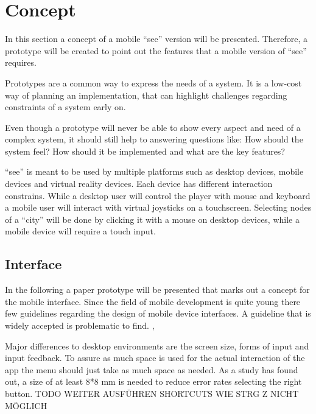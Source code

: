 \section{Concept}
\label{section:concept}
In this section a concept of a mobile \enquote{\gls{see}} version will be presented. 
Therefore, a prototype will be created to point out the features that a mobile version of \enquote{\gls{see}} requires.

Prototypes are a common way to express the needs of a system. 
It is a low-cost way of planning an implementation, that can highlight challenges regarding constraints of a system early on.

Even though a prototype will never be able to show every aspect and need of a complex system, it should still help to answering questions like: 
How should the system feel? How should it be implemented and what are the key features? \cite{houde1997prototypes} 

\enquote{\gls{see}} is meant to be used by multiple platforms such as desktop devices, mobile devices and virtual reality devices.
Each device has different interaction constrains. 
While a desktop user will control the player with mouse and keyboard a mobile user will interact with virtual joysticks on a touchscreen.
Selecting nodes of a \enquote{\gls{city}} will be done by clicking it with a mouse on desktop devices, while a mobile device will require a touch input.

\subsection{Interface}

In the following a paper prototype will be presented that marks out a concept for the mobile interface.
Since the field of mobile development is quite young there few guidelines regarding the design of mobile device interfaces.
A guideline that is widely accepted is problematic to find. \cite{renaud2017demarcating}, \cite{punchoojit2017usability}

Major differences to desktop environments are the screen size, forms of input and input feedback.
To assure as much space is used for the actual interaction of the app the menu should just take as much space as needed.
As a study has found out, a size of at least 8*8 mm is needed to reduce error rates selecting the right button. \cite{conradi2015optimal} \cite{parhi2006target}
TODO WEITER AUSFÜHREN
SHORTCUTS WIE STRG Z NICHT MÖGLICH
 \cite{adipat2005interface} 

